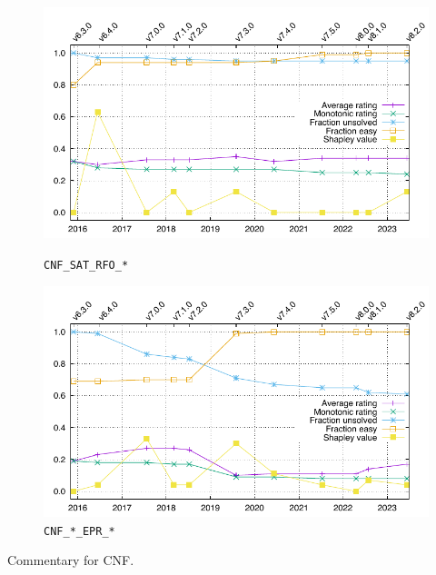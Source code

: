 \documentclass[runningheads]{llncs}
\begin{document}
\begin{figure}[ht!]
\centering
\begin{minipage}[t]{.49\textwidth}
  \centering
  \includegraphics[width=\textwidth]{Plots/GNUPlots/CNF_SAT_RFO.pdf}
  \vspace*{-2em}
  \caption{{\tt CNF\_SAT\_RFO\_*}}
  \label{Plot_CNF_SAT}
\end{minipage}
\begin{minipage}[t]{.49\textwidth}
  \centering
  \includegraphics[width=\textwidth]{Plots/GNUPlots/CNF_EPR.pdf}
  \vspace*{-2em}
  \caption{{\tt CNF\_*\_EPR\_*}}
  \label{Plot_CNF_EPR}
\end{minipage}
\end{figure}

Commentary for CNF.
\end{document}
